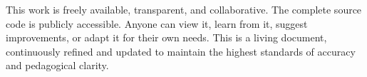 \thispagestyle{empty}
\null
\vspace*{\fill}
\begin{flushleft}
\begin{minipage}{0.78\textwidth}
This work is freely available, transparent, and collaborative. The complete source code is publicly accessible. Anyone can view it, learn from it, suggest improvements, or adapt it for their own needs. This is a living document, continuously refined and updated to maintain the highest standards of accuracy and pedagogical clarity.
\end{minipage}
\end{flushleft}
\vspace*{\fill}
\clearpage

